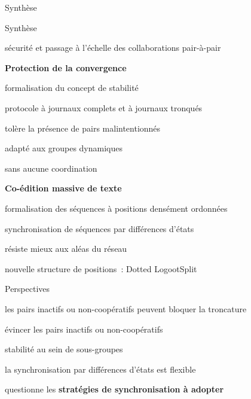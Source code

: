 \begin{frame}
    Synthèse
\end{frame}


\begin{frame}{Synthèse}
    \begin{compactitemize}
        \item sécurité et passage à l'échelle des collaborations pair-à-pair
    \end{compactitemize}
    \textbf{Protection de la convergence}
    \begin{compactitemize}
        \item formalisation du concept de stabilité
        \item protocole à journaux complets et à journaux tronqués
        \begin{compactitemize}
            \item tolère la présence de pairs malintentionnés
            \item adapté aux groupes dynamiques
            \item sans aucune coordination
        \end{compactitemize}
    \end{compactitemize}
    \textbf{Co-édition massive de texte}
    \begin{compactitemize}
        \item formalisation des séquences à positions densément ordonnées
        \item synchronisation de séquences par différences d'états
        \begin{compactitemize}
            \item résiste mieux aux aléas du réseau
        \end{compactitemize}
        \item nouvelle structure de positions~: Dotted LogootSplit
    \end{compactitemize}
\end{frame}


\begin{frame}{Perspectives}
    \begin{compactitemize}
        \item les pairs inactifs ou non-coopératifs peuvent bloquer la troncature
        \begin{compactitemize}
            \item évincer les pairs inactifs ou non-coopératifs
            \item stabilité au sein de sous-groupes
        \end{compactitemize}
        \item la synchronisation par différences d'états est flexible
        \begin{compactitemize}
            \item questionne les \textbf{stratégies de synchronisation à adopter}
        \end{compactitemize}
    \end{compactitemize}
\end{frame}


